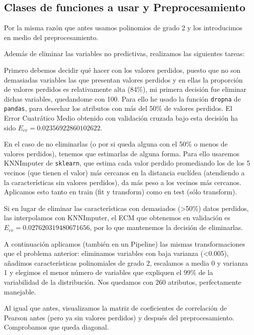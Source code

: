 \documentclass[a4]{article}
\begin{document}
\subsection{Clases de funciones a usar y Preprocesamiento}

Por la misma razón que antes usamos polinomios de grado 2 y los
introducimos en medio del preprocesamiento.

Además de eliminar las variables no predictivas, realizamos las
siguientes tareas:

Primero debemos decidir qué hacer con los valores perdidos, puesto que
no son demasiadas variables las que presentan valores perdidos y en
ellas la proporción de valores perdidos es relativamente alta (84\%),
mi primera decisión fue eliminar dichas variables, quedandome con 100.
Para ello he usado la función \texttt{dropna} de \texttt{pandas}, para
desechar los atributos con más del 50\% de valores perdidos. El Error
Cuatrático Medio obtenido con validación cruzada bajo esta decisión ha
sido $E_{cv} = 0.02356922860102622$.

En el caso de no eliminarlas (o por si queda alguna con el 50\% o
menos de valores perdidos), tenemos que estimarlas de alguna
forma. Para ello usaremos KNNImputer de \texttt{sklearn}, que estima
cada valor perdido promediando los de los 5 vecinos (que tienen el
valor) más cercanos en la distancia euclídea (atendiendo a la
características sin valores perdidos), da más peso a los vecinos más
cercanos. Aplicamos esto tanto en train (fit y transform) como en test
(sólo transform).

Si en lugar de eliminar las características con demasiados (>50\%)
datos perdidos, las interpolamos con KNNImputer, el ECM que obtenemos
en validación es $E_{cv} = 0.027620319480671656$, por lo que
mantenemos la decisión de eliminarlas.

A continuación aplicamos (también en un Pipeline) las mismas
transformaciones que el problema anterior: eliminamos variables con
baja varianza (<0.005), añadimos características polinomiales de grado
2, escalamos a media 0 y varianza 1 y elegimos el menor número de
variables que expliquen el 99\% de la variabilidad de la distribución.
Nos quedamos con 260 atributos, perfectamente manejable.

Al igual que antes, visualizamos la matriz de coeficientes de
correlación de Pearson antes (pero ya sin valores perdidos) y después
del preprocesamiento. Comprobamos que queda diagonal.
\end{document}
